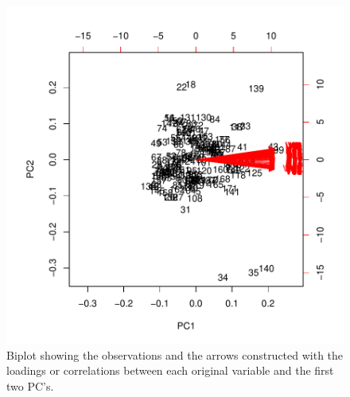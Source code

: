 \documentclass[letterpaper]{article}
\begin{document}
\begin{figure}
\begin{center}
\includegraphics{HW05Key-figbiplot}
\end{center}
\caption{Biplot showing the observations and the arrows constructed with the loadings or correlations between each original variable and the first two PC's.}
\label{fig:qq}
\end{figure}
\end{document}
